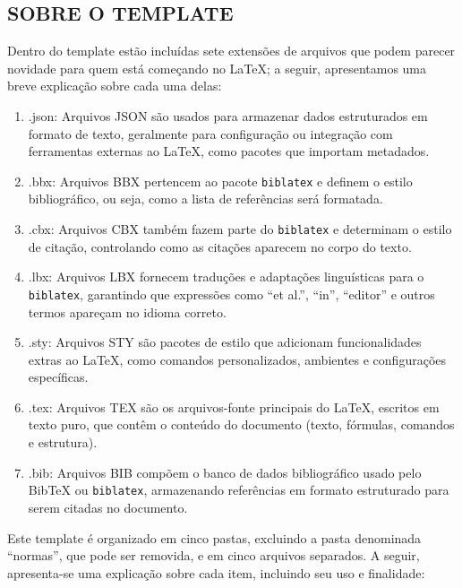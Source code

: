\subsection{SOBRE O TEMPLATE}

Dentro do template estão incluídas sete extensões de arquivos que podem parecer novidade para quem está começando no \LaTeX; a seguir, apresentamos uma breve explicação sobre cada uma delas:

\begin{enumerate} 

\item .json: Arquivos JSON são usados para armazenar dados estruturados em formato de texto, geralmente para configuração ou integração com ferramentas externas ao \LaTeX, como pacotes que importam metadados.  

\item .bbx: Arquivos BBX pertencem ao pacote \texttt{biblatex} e definem o estilo bibliográfico, ou seja, como a lista de referências será formatada.  

\item .cbx: Arquivos CBX também fazem parte do \texttt{biblatex} e determinam o estilo de citação, controlando como as citações aparecem no corpo do texto.  

\item .lbx: Arquivos LBX fornecem traduções e adaptações linguísticas para o \texttt{biblatex}, garantindo que expressões como “et al.”, “in”, “editor” e outros termos apareçam no idioma correto.  

\item .sty: Arquivos STY são pacotes de estilo que adicionam funcionalidades extras ao LaTeX, como comandos personalizados, ambientes e configurações específicas.  

\item .tex: Arquivos TEX são os arquivos-fonte principais do \LaTeX, escritos em texto puro, que contêm o conteúdo do documento (texto, fórmulas, comandos e estrutura).  

\item .bib: Arquivos BIB compõem o banco de dados bibliográfico usado pelo BibTeX ou \texttt{biblatex}, armazenando referências em formato estruturado para serem citadas no documento.  

\end{enumerate}

Este template é organizado em cinco pastas, excluindo a pasta denominada “normas”, que pode ser removida, e em cinco arquivos separados. A seguir, apresenta-se uma explicação sobre cada item, incluindo seu uso e finalidade:

